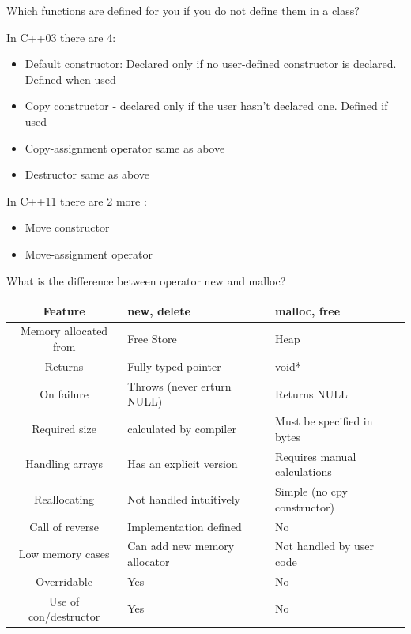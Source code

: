 \documentclass[answers]{exam}
\begin{document}
\begin{questions}
\question Which functions are defined for you if you do not define them in a class?
\begin{solution}[.2in]
In C++03 there are 4:
\begin{itemize}
	\item Default constructor: Declared only if no user-defined constructor is declared. Defined when used
	\item Copy constructor - declared only if the user hasn't declared one. Defined if used	
	\item Copy-assignment operator same as above	
	\item Destructor same as above	
\end{itemize}	
In C++11 there are 2 more :
\begin{itemize}
	\item Move constructor
	\item Move-assignment operator	
\end{itemize}	
\end{solution}

\question What is the difference between operator new and malloc?
\begin{solution}[.2in]
\begin{center}
	\begin{tabular}{c|ll}
		\hline
		Feature & new, delete & malloc, free \\
 		\hline
		Memory allocated from & Free Store & Heap\\
 		\hline
        Returns & Fully typed pointer & void*\\
		\hline
		On failure & Throws (never erturn NULL) & Returns NULL\\
		\hline
		Required size & calculated by compiler & Must be specified in bytes\\
		\hline
		Handling arrays & Has an explicit version & Requires manual calculations\\
		\hline
		Reallocating & Not handled intuitively & Simple (no cpy constructor)\\
		\hline
		Call of reverse & Implementation defined & No\\
		\hline
		Low memory cases & Can add new memory allocator & Not handled by user code\\
		\hline
		Overridable & Yes & No\\
		\hline
		Use of con/destructor & Yes & No\\
		\hline
	\end{tabular} 
\end{center}
\end{solution}


\end{questions}
\end{document}

